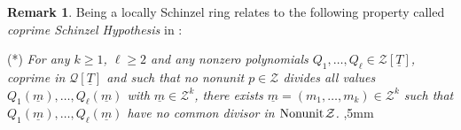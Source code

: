 \documentclass[11pt,a4paper,reqno]{amsart}
\newtheorem{prop}[thm]{Proposition}
\theoremstyle{definition}
\newtheorem{rmk}[thm]{Remark}
\begin{document}
\begin{rmk} \label{rmk:int-H-coprimeS}
Being a locally Schinzel ring relates to the following property called \emph{coprime Schinzel Hypothesis} in \cite{BDKN22}: 
\vskip 1mm

\noindent
(*) \emph{For any $k\geq 1$, $\ell \geq 2$ and any nonzero polynomials $Q_1,\ldots,Q_\ell \in {\mathcal Z}[\underline{T}]$, coprime in ${\mathcal Q}[\underline T]$ and such that no nonunit $p\in {\mathcal Z}$ divides all values $Q_{1}(\underline{m}),\dots,Q_{\ell}(\underline{m})$ with $\underline m\in {\mathcal Z}^k$, there exists $\underline m= (m_1,\ldots,m_{k})\in {\mathcal Z}^{k}$ such that $Q_1(\underline m), \ldots, Q_\ell(\underline m)$ have no common divisor in ${\rm Nonunit}\hskip 1pt\mathcal{Z}$.}
,5mm

%







\end{rmk}
\end{document}
